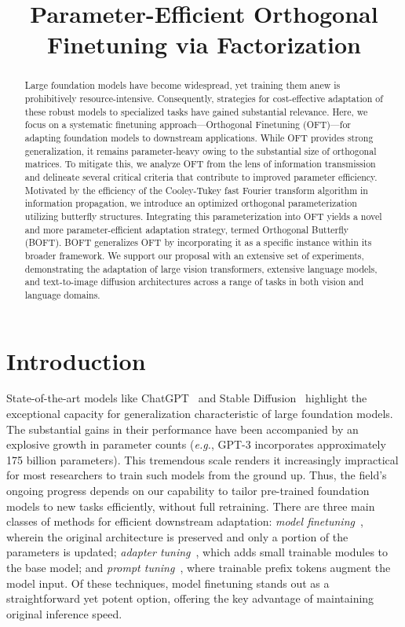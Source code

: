 \title{Parameter-Efficient Orthogonal Finetuning via Factorization}

\begin{abstract}
Large foundation models have become widespread, yet training them anew is prohibitively resource-intensive. Consequently, strategies for cost-effective adaptation of these robust models to specialized tasks have gained substantial relevance. Here, we focus on a systematic finetuning approach—Orthogonal Finetuning (OFT)—for adapting foundation models to downstream applications. While OFT provides strong generalization, it remains parameter-heavy owing to the substantial size of orthogonal matrices. To mitigate this, we analyze OFT from the lens of information transmission and delineate several critical criteria that contribute to improved parameter efficiency. Motivated by the efficiency of the Cooley-Tukey fast Fourier transform algorithm in information propagation, we introduce an optimized orthogonal parameterization utilizing butterfly structures. Integrating this parameterization into OFT yields a novel and more parameter-efficient adaptation strategy, termed Orthogonal Butterfly (BOFT). BOFT generalizes OFT by incorporating it as a specific instance within its broader framework. We support our proposal with an extensive set of experiments, demonstrating the adaptation of large vision transformers, extensive language models, and text-to-image diffusion architectures across a range of tasks in both vision and language domains.
\end{abstract}

\section{Introduction}

State-of-the-art models like ChatGPT~\cite{brown2020language,chen2021evaluating} and Stable Diffusion~\cite{rombach2022high} highlight the exceptional capacity for generalization characteristic of large foundation models. The substantial gains in their performance have been accompanied by an explosive growth in parameter counts (\emph{e.g.}, GPT-3 incorporates approximately 175 billion parameters). This tremendous scale renders it increasingly impractical for most researchers to train such models from the ground up. Thus, the field's ongoing progress depends on our capability to tailor pre-trained foundation models to new tasks efficiently, without full retraining. There are three main classes of methods for efficient downstream adaptation: \emph{model finetuning}~\cite{hulora2022,zaken2022bitfit,guo2020parameter,raffel2020exploring,qiu2023controlling,zhang2022adaptive,chavan2023one}, wherein the original architecture is preserved and only a portion of the parameters is updated; \emph{adapter tuning}~\cite{rebuffi2017learning,houlsby2019parameter,pfeiffer2020adapterfusion,lin2020exploring,he2021towards}, which adds small trainable modules to the base model; and \emph{prompt tuning}~\cite{li2021prefix,lester2021power}, where trainable prefix tokens augment the model input. Of these techniques, model finetuning stands out as a straightforward yet potent option, offering the key advantage of maintaining original inference speed.

